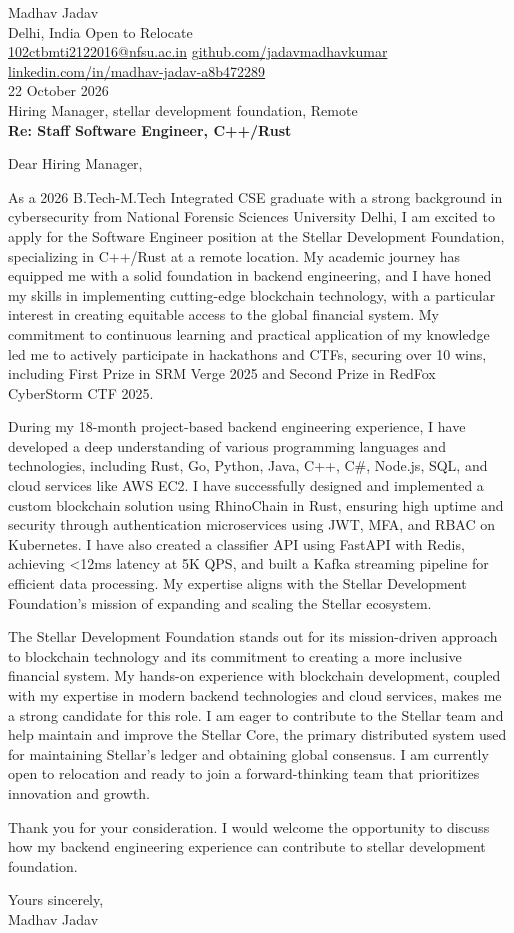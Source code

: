\documentclass[10pt,letterpaper]{article}
\begin{document}
\begin{flushleft}
Madhav Jadav\\
Delhi, India \textbar{} Open to Relocate\\
\href{mailto:102ctbmti2122016@nfsu.ac.in}{102ctbmti2122016@nfsu.ac.in} \textbar{} \href{https://github.com/jadavmadhavkumar}{github.com/jadavmadhavkumar} \textbar{} \href{https://www.linkedin.com/in/madhav-jadav-a8b472289}{linkedin.com/in/madhav-jadav-a8b472289}\\[8pt]
22 October 2026\\[4pt]
Hiring Manager, stellar development foundation, Remote\\[8pt]
\textbf{Re: Staff Software Engineer, C++/Rust}\\[8pt]
\end{flushleft}
Dear Hiring Manager,

As a 2026 B.Tech-M.Tech Integrated CSE graduate with a strong background in cybersecurity from National Forensic Sciences University Delhi, I am excited to apply for the Software Engineer position at the Stellar Development Foundation, specializing in C++/Rust at a remote location. My academic journey has equipped me with a solid foundation in backend engineering, and I have honed my skills in implementing cutting-edge blockchain technology, with a particular interest in creating equitable access to the global financial system. My commitment to continuous learning and practical application of my knowledge led me to actively participate in hackathons and CTFs, securing over 10 wins, including First Prize in SRM Verge 2025 and Second Prize in RedFox CyberStorm CTF 2025.

During my 18-month project-based backend engineering experience, I have developed a deep understanding of various programming languages and technologies, including Rust, Go, Python, Java, C++, C\#, Node.js, SQL, and cloud services like AWS EC2. I have successfully designed and implemented a custom blockchain solution using RhinoChain in Rust, ensuring high uptime and security through authentication microservices using JWT, MFA, and RBAC on Kubernetes. I have also created a classifier API using FastAPI with Redis, achieving <12ms latency at 5K QPS, and built a Kafka streaming pipeline for efficient data processing. My expertise aligns with the Stellar Development Foundation's mission of expanding and scaling the Stellar ecosystem.

The Stellar Development Foundation stands out for its mission-driven approach to blockchain technology and its commitment to creating a more inclusive financial system. My hands-on experience with blockchain development, coupled with my expertise in modern backend technologies and cloud services, makes me a strong candidate for this role. I am eager to contribute to the Stellar team and help maintain and improve the Stellar Core, the primary distributed system used for maintaining Stellar's ledger and obtaining global consensus. I am currently open to relocation and ready to join a forward-thinking team that prioritizes innovation and growth.

Thank you for your consideration. I would welcome the opportunity to discuss how my backend engineering experience can contribute to stellar development foundation.

Yours sincerely,\\[8pt]
Madhav Jadav
\end{document}
